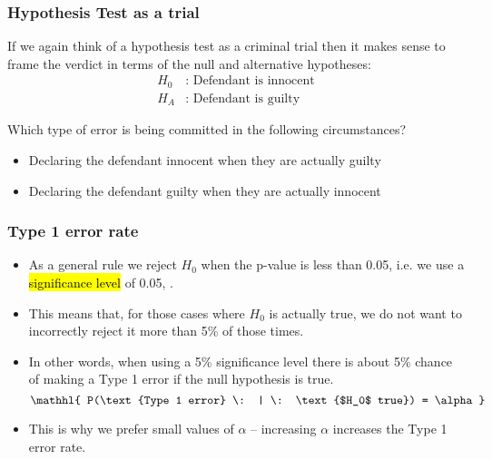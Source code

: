 \documentclass[t,compress,mathserif]{beamer}
\newcommand{\soln}[1]{\textit{#1}}
\begin{document}
\begin{frame}[shrink]
\frametitle{Hypothesis Test as a trial}

If we again think of a hypothesis test as a criminal trial then it makes sense to frame the verdict in terms of the null and alternative hypotheses:
\begin{align*}
H_0&:\text{ Defendant is innocent} \\
H_A&:\text{ Defendant is guilty}
\end{align*}

Which type of error is being committed in the following circumstances?

\begin{itemize}
\item Declaring the defendant innocent when they are actually guilty
\soln{}
\item Declaring the defendant guilty when they are actually innocent
\soln{}
\end{itemize}

\end{frame}


\begin{frame}
\frametitle{Type 1 error rate}

\begin{itemize}

\item As a general rule we reject $H_0$ when the p-value is less than 0.05, i.e. we use a \hl{significance level} of 0.05, .

\pause

\item This means that, for those cases where $H_0$ is actually true, we do not want to incorrectly reject it more than 5\% of those times. 

\pause

\item In other words, when using a 5\% significance level there is about 5\% chance of making a Type 1 error if the null hypothesis is true.
\[ \mathhl{ P(\text{Type 1 error} \: | \: \text{$H_0$ true}) = \alpha } \]

\pause

\item This is why we prefer small values of $\alpha$ -- increasing $\alpha$ increases the Type 1 error rate.

\end{itemize}

\end{frame}
\end{document}
